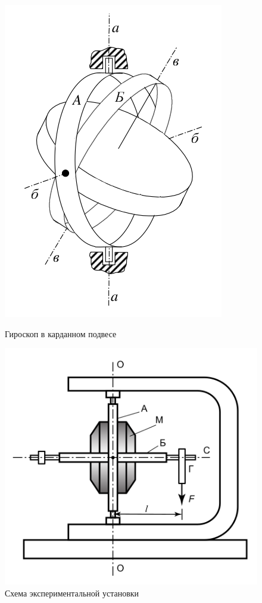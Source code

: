 		\begin{figure}
			\centering
			\begin{minipage}{0.4\textwidth}
				\centering
				\includegraphics[width=0.9\linewidth]{gyro.png}
				\caption{Гироскоп в карданном подвесе}
				\label{fig:gyro}
			\end{minipage}\hfill
            \begin{minipage}{0.6\textwidth}
				\centering
				\includegraphics[width=0.9\linewidth]{setting.png}
				\caption{Схема экспериментальной установки}
				\label{fig:setting}
			\end{minipage}
        \end{figure}

